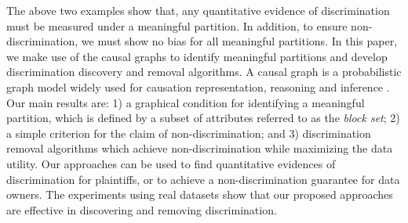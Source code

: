 \documentclass[twoside,leqno,twocolumn]{article}
\begin{document}
The above two examples show that, any quantitative evidence of discrimination must be measured under a meaningful partition. In addition, to ensure non-discrimination, we must show no bias for all meaningful partitions. In this paper, we make use of the causal graphs to identify meaningful partitions and develop discrimination discovery and removal algorithms. A causal graph is a probabilistic graph model widely used for causation representation, reasoning and inference \cite{spirtes2000causation}. %
Our main results are: 1) a graphical condition for identifying a meaningful partition, which is defined by a subset of attributes referred to as the \emph{block set}; 2) a simple criterion for the claim of non-discrimination; and 3) discrimination removal algorithms which achieve non-discrimination while maximizing the data utility. Our approaches can be used to find quantitative evidences of discrimination for plaintiffs, or to achieve a non-discrimination guarantee for data owners. The experiments using real datasets show that our proposed approaches are effective in discovering and removing discrimination. 


\end{document}
